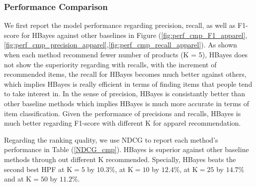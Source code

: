 \begin{table}[htb]
\begin{center}
\end{center}
\caption{NDCG on apparel recommendations}
\label{NDCG_cmp}
\end{table}

\subsubsection{Performance Comparison}
We first report the model performance regarding precision, recall, as well as F1-score for HBayes against other baselines in Figure (\ref{fig:perf_cmp_F1_apparel},\ref{fig:perf_cmp_precision_apparel},\ref{fig:perf_cmp_recall_apparel}).  As shown when each method recommend fewer number of products (K = 5), HBayes does not show the superiority regarding with recalls, with the increment of recommended items, the recall for HBayes becomes much better against others, which implies HBayes is really efficient in terms of finding items that people tend to take interest in.  In the sense of precision, HBayes is consistantly better than other baseline methods which implies HBayes is much more accurate in terms of item classification.   Given the performance of precisions and recalls, HBayes is much better regarding F1-score with different K for apparel recommendation.

Regarding the ranking quality, we use NDCG to report each method's performance in Table (\ref{NDCG_cmp}).  HBayes is superior against other baseline methods through out different K recommended.  Specially, HBayes beats the second best HPF at $\text{K}=5$ by $10.3\%$, at $\text{K}=10$ by $12.4\%$, at $\text{K}=25$ by $14.7\%$ and at $\text{K}=50$ by $11.2\%$.  

